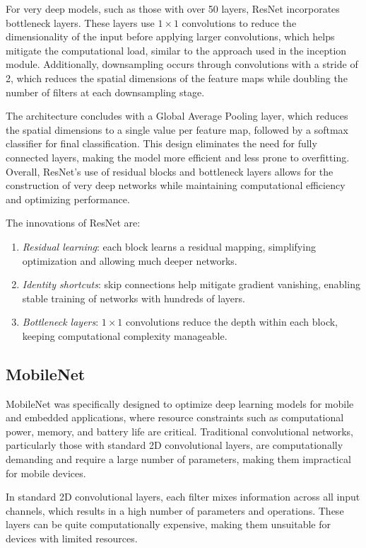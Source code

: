 For very deep models, such as those with over 50 layers, ResNet incorporates bottleneck layers. 
These layers use $1\times 1$ convolutions to reduce the dimensionality of the input before applying larger convolutions, which helps mitigate the computational load, similar to the approach used in the inception module. 
Additionally, downsampling occurs through convolutions with a stride of 2, which reduces the spatial dimensions of the feature maps while doubling the number of filters at each downsampling stage.

The architecture concludes with a Global Average Pooling layer, which reduces the spatial dimensions to a single value per feature map, followed by a softmax classifier for final classification. 
This design eliminates the need for fully connected layers, making the model more efficient and less prone to overfitting. 
Overall, ResNet's use of residual blocks and bottleneck layers allows for the construction of very deep networks while maintaining computational efficiency and optimizing performance.

The innovations of ResNet are: 
\begin{enumerate}
    \item \textit{Residual learning}: each block learns a residual mapping, simplifying optimization and allowing much deeper networks.
    \item \textit{Identity shortcuts}: skip connections help mitigate gradient vanishing, enabling stable training of networks with hundreds of layers.
    \item \textit{Bottleneck layers}: $1\times 1$ convolutions reduce the depth within each block, keeping computational complexity manageable.
\end{enumerate}

\subsection{MobileNet}
MobileNet was specifically designed to optimize deep learning models for mobile and embedded applications, where resource constraints such as computational power, memory, and battery life are critical. 
Traditional convolutional networks, particularly those with standard 2D convolutional layers, are computationally demanding and require a large number of parameters, making them impractical for mobile devices.

In standard 2D convolutional layers, each filter mixes information across all input channels, which results in a high number of parameters and operations. 
These layers can be quite computationally expensive, making them unsuitable for devices with limited resources.

